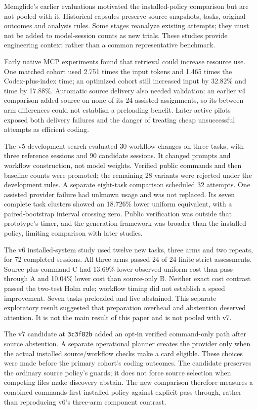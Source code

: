 \documentclass[manuscript,screen,nonacm]{acmart}
\begin{document}
Memglide's earlier evaluations motivated the installed-policy comparison
but are not pooled with it. Historical capsules preserve source
snapshots, tasks, original outcomes and analysis rules. Some stages
reanalyze existing attempts; they must not be added to model-session
counts as new trials. These studies provide engineering context rather
than a common representative benchmark.

Early native MCP experiments found that retrieval could increase
resource use. One matched cohort used 2.751 times the input tokens and
1.465 times the Codex-plus-index time; an optimized cohort still
increased input by 32.82\% and time by 17.88\%. Automatic source
delivery also needed validation: an earlier v4 comparison added source
on none of its 24 assisted assignments, so its between-arm differences
could not establish a preloading benefit. Later active pilots exposed
both delivery failures and the danger of treating cheap unsuccessful
attempts as efficient coding.

The v5 development search evaluated 30 workflow changes on three tasks,
with three reference sessions and 90 candidate sessions. It changed
prompts and workflow construction, not model weights. Verified public
commands and then baseline counts were promoted; the remaining 28
variants were rejected under the development rules. A separate
eight-task comparison scheduled 32 attempts. One assisted provider
failure had unknown usage and was not replaced. Its seven complete task
clusters showed an 18.726\% lower uniform equivalent, with a
paired-bootstrap interval crossing zero. Public verification was outside
that prototype's timer, and the generation framework was broader than
the installed policy, limiting comparison with later studies.

The v6 installed-system study used twelve new tasks, three arms and two
repeats, for 72 completed sessions. All three arms passed 24 of 24
finite strict assessments. Source-plus-command C had 13.69\% lower
observed uniform cost than pass-through A and 10.04\% lower cost than
source-only B. Neither exact cost contrast passed the two-test Holm
rule; workflow timing did not establish a speed improvement. Seven tasks
preloaded and five abstained. This separate exploratory result suggested
that preparation overhead and abstention deserved attention. It is not
the main result of this paper and is not pooled with v7.

The v7 candidate at \texttt{3c3f82b} added an opt-in verified
command-only path after source abstention. A separate operational
planner creates the provider only when the actual installed
source/workflow checks make a card eligible. These choices were made
before the primary cohort's coding outcomes. The candidate preserves the
ordinary source policy's guards; it does not force source selection when
competing files make discovery abstain. The new comparison therefore
measures a combined commands-first installed policy against explicit
pass-through, rather than reproducing v6's three-arm component contrast.
\end{document}
